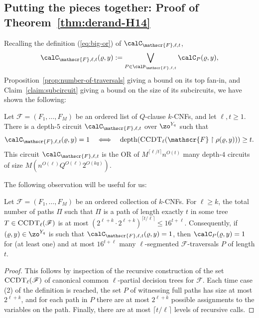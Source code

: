 \documentclass{toc}
\theoremstyle{plain}
\newcommand{\uhr}{\upharpoonright}
\newcommand{\CCDT}{\textsc{CCDT}}
\newcommand{\depth}{\mathrm{depth}}
\begin{document}
\subsection{Putting the pieces together: Proof of Theorem~\ref{thm:derand-H14}}

Recalling the definition (\ref{eq:big-or}) of $\calC_{\mathscr{F},\ell,t}$, 
\[ \calC_{\mathscr{F},\ell,t}(\varrho,y) := \bigvee_{P\in\calP_{\mathscr{F},\ell,t}} \calC_P(\varrho,y), \] 
Proposition~\ref{prop:number-of-traversals} giving a bound on its top fan-in, and Claim~\ref{claim:subcircuit} giving a bound on the size of its subcircuits, we have shown the following: 

\begin{claim}
\label{claim:overall-ckt}  
Let $\mathscr{F} = (F_1,\ldots,F_M)$ be an ordered list of $Q$-clause $k$-CNFs, and let $\ell,t\ge 1$.  There is a depth-$5$ circuit $\calC_{\mathscr{F},\ell,t}$ over $\zo^{Y_q}$ such that 
\[ \calC_{\mathscr{F},\ell,t}(\varrho,y) = 1 \quad \Longleftrightarrow \quad \depth(\CCDT_\ell(\mathscr{F} \uhr \rho(\varrho,y))) \ge t. \] 
This circuit $\calC_{\mathscr{F},\ell,t}$ is the OR of $M^{\lceil \ell/t\rceil} n^{O(t)}$ many depth-$4$ circuits of size $M(n^{O(\ell)}Q^{O(\ell)}2^{O(kq)})$. 
\end{claim} 




The following observation will be useful for us: 

\begin{observation}
\label{obs:few-sat} 
Let $\mathscr{F} = (F_1,\ldots,F_M)$ be an ordered collection of $k$-CNFs.  For $\ell \geq k$, the total number of paths $\Pi$ such that $\Pi$ is a path of length exactly $t$ in some tree $T \in \CCDT_\ell(\mathscr{F})$ is at most $(2^{\ell+k} \cdot 2^{\ell + k})^{\lceil t/\ell\rceil} \le 16^{t+\ell}$. 
Consequently, if $(\varrho,y)\in \zo^{Y_q}$ is such that $\calC_{\mathscr{F},\ell,t}(\varrho,y) = 1$, then $\calC_P(\varrho,y) =1$ for (at least one) and at most $16^{t+\ell}$ many $\ell$-segmented $\mathscr{F}$-traversals $P$ of length $t$. 
\end{observation}

\begin{proof}
This follows by inspection of the recursive construction of the set $\CCDT_\ell(\mathscr{F})$ of canonical common $\ell$-partial decision trees for $\mathscr{F}$.  Each time case (2) of the definition is reached, the set $P$ of witnessing full paths has size at most $2^{\ell + k}$, and for each path in $P$ there are at most $2^{\ell + k}$ possible assignments to the variables on the path.  Finally, there are at most $\lceil t/\ell \rceil$ levels of recursive calls. 
\end{proof} 
\end{document}
